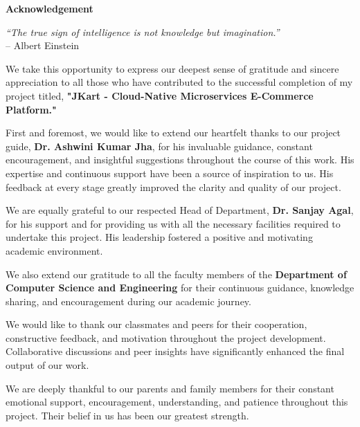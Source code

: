 \thispagestyle{empty}
\newpage
\cleardoublepage{}
{}
\begin{center}
{\Large \bf Acknowledgement}\\[10pt]
\end{center}

\begin{flushright}
\textit{“The true sign of intelligence is not knowledge but imagination.”}\\
\vspace{2mm}
– Albert Einstein
\end{flushright}

\vspace{10pt}

We take this opportunity to express our deepest sense of gratitude and sincere appreciation to all those who have contributed to the successful completion of my project titled, \textbf{"JKart - Cloud-Native Microservices E-Commerce Platform."}

First and foremost, we would like to extend our heartfelt thanks to our project guide, \textbf{Dr. Ashwini Kumar Jha}, for his invaluable guidance, constant encouragement, and insightful suggestions throughout the course of this work. His expertise and continuous support have been a source of inspiration to us. His feedback at every stage greatly improved the clarity and quality of our project.

We are equally grateful to our respected Head of Department, \textbf{Dr. Sanjay Agal}, for his support and for providing us with all the necessary facilities required to undertake this project. His leadership fostered a positive and motivating academic environment.

We also extend our gratitude to all the faculty members of the \textbf{Department of Computer Science and Engineering} for their continuous guidance, knowledge sharing, and encouragement during our academic journey.

We would like to thank our classmates and peers for their cooperation, constructive feedback, and motivation throughout the project development. Collaborative discussions and peer insights have significantly enhanced the final output of our work.

We are deeply thankful to our parents and family members for their constant emotional support, encouragement, understanding, and patience throughout this project. Their belief in us has been our greatest strength.

